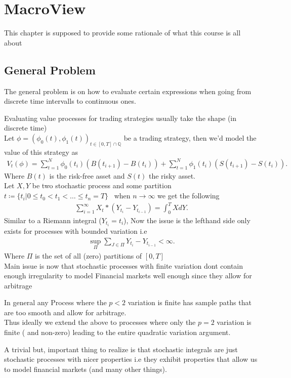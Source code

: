 \chapter{MacroView}
This chapter is supposed to provide some rationale of what this course is all about
\section{General Problem}
The general problem is on how to evaluate certain expressions when going from discrete time intervalls
to continuous ones.
\begin{Example}
	Evaluating value processes for trading strategies usually take the shape (in discrete time) \\[1ex]
	Let $\phi  = (\phi_{0}(t),\phi_1(t))_{t \in [0,T] \cap \mathbb{Q}}$ be a trading strategy, then we'd model the value of this strategy as
	\begin{align*}
    V_t(\phi ) = \sum_{t=1}^{N} \phi_0(t_i)(B(t_{i+1}) - B(t_{i})) +  \sum_{t=1}^{N} \phi_1(t_i)(S(t_{i+1}) - S(t_{i}))
	.\end{align*}
  Where $B(t)$ is the risk-free asset and $S(t)$ the risky asset. \\[1ex]
  Let $X,Y$ be two stochastic process and some partition $t \coloneqq  \{t_i | 0\le t_0<t_{1}<\ldots \le t_n = T\}  $ \ when $n \to \infty$ we get the following
  \begin{align*}
    \sum_{i=1}^{\infty}  X_t*(Y_{t_i} - Y_{t_{i-1}}) = \int_0^{T}  X dY
  .\end{align*}
  Similar to a Riemann integral ($Y_{t_i} = t_i$),
  Now the issue is  the lefthand side only exists for processes with bounded variation i.e 
  \begin{align*}
    \sup_{\Pi }  \sum_{J \in  \Pi} Y_{t_{i}} - Y_{t_{i-1}}  < \infty
  .\end{align*}
  Where $\Pi $ is the set of all (zero) partitions of $[0,T]$\\[1ex]
  Main issue is now that stochastic processes with finite variation dont contain enough irregularity to model
  Financial markets well enough since they allow for arbitrage
\end{Example}
In general any Process where the $p<2$ variation is finite has sample paths that are too smooth and allow for arbitrage.\\[1ex]
Thus ideally we extend the above to processes where only the $p=2$ variation is finite ( and non-zero) leading to the entire quadratic variation argument.
\begin{remark}
  A trivial but, important thing to realize is that stochastic integrals are just stochastic processes with nicer properties i.e
  they exhibit properties that allow us to model financial markets (and many other things).
\end{remark}
